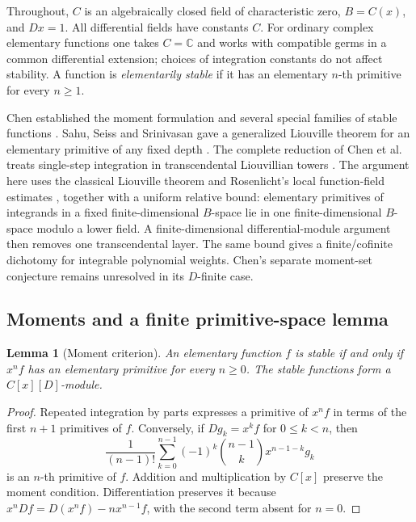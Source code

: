 \documentclass[11pt,a4paper]{article}
\newtheorem{lemma}[theorem]{Lemma}
\theoremstyle{definition}
\theoremstyle{remark}
\numberwithin{equation}{section}
\begin{document}
Throughout, $C$ is an algebraically closed field of characteristic zero,
$B=C(x)$, and $D x=1$.  All differential fields have constants $C$.
For ordinary complex elementary functions one takes $C=\mathbb C$ and
works with compatible germs in a common differential extension; choices
of integration constants do not affect stability.  A function is
\emph{elementarily stable} if it has an elementary $n$-th primitive for
every $n\geq 1$.

Chen established the moment formulation and several special families of
stable functions \cite{stab:Chen}.  Sahu, Seiss and Srinivasan gave a
generalized Liouville theorem for an elementary primitive of any fixed
depth \cite{stab:SSS}.  The complete reduction of Chen et al. treats
single-step integration in transcendental Liouvillian towers
\cite{stab:CDGHLL}.  The argument here uses the classical Liouville theorem
\cite{stab:Rosenlicht} and Rosenlicht's local function-field estimates
\cite{stab:Rosenlicht1969}, together with a uniform relative bound:
elementary primitives of integrands in a fixed finite-dimensional
$B$-space lie in one finite-dimensional $B$-space modulo a lower field.
A finite-dimensional differential-module argument then removes one
transcendental layer. The same bound gives a finite/cofinite dichotomy
for integrable polynomial weights. Chen's separate moment-set
conjecture remains unresolved in its $D$-finite case.

\subsection{Moments and a finite primitive-space lemma}

\begin{lemma}[Moment criterion]\label{stab:moments}
An elementary function $f$ is stable if and only if $x^n f$ has an
elementary primitive for every $n\geq0$.  The stable functions form a
$C[x][D]$-module.
\end{lemma}
\begin{proof}
Repeated integration by parts expresses a primitive of $x^n f$ in terms
of the first $n+1$ primitives of $f$.  Conversely, if $Dg_k=x^k f$ for
$0\leq k<n$, then
\[
 \frac1{(n-1)!}\sum_{k=0}^{n-1}(-1)^k
       \binom{n-1}{k}x^{n-1-k}g_k
\]
is an $n$-th primitive of $f$.  Addition and multiplication by $C[x]$
preserve the moment condition.  Differentiation preserves it because
$x^n Df=D(x^n f)-n x^{n-1}f$, with the second term absent for $n=0$.
\end{proof}
\end{document}
